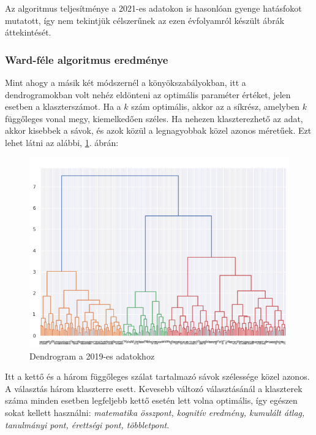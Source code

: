 \documentclass[12pt]{article}
\begin{document}
Az algoritmus teljesítménye a 2021-es adatokon is hasonlóan gyenge hatásfokot mutatott, így nem tekintjük célszerűnek az ezen évfolyamról készült ábrák áttekintését.

\subsubsection{Ward-féle algoritmus eredménye}

Mint ahogy a másik két módszernél a könyökszabályokban, itt a dendrogramokban volt nehéz eldönteni az optimális paraméter értéket, jelen esetben a klaszterszámot. Ha a $k$ szám optimális, akkor az a síkrész, amelyben $k$ függőleges vonal megy, kiemelkedően széles. Ha nehezen klaszterezhető az adat, akkor kisebbek a sávok, és azok közül a legnagyobbak közel azonos méretűek. Ezt lehet látni az alábbi, \ref{fig:dendrogram}. ábrán:

\begin{figure}[H]
\centering
\includegraphics[width = \textwidth]{kepek/dendrogram.png}
\caption{Dendrogram a 2019-es adatokhoz}
\label{fig:dendrogram}
\end{figure}

Itt a kettő és a három függőleges szálat tartalmazó sávok szélessége közel azonos. A választás három klaszterre esett. Kevesebb változó választásánál a klaszterek száma minden esetben legfeljebb kettő esetén lett volna optimális, így egészen sokat kellett használni: \textit{matematika összpont, kognitív eredmény, kumulált átlag, tanulmányi pont, érettségi pont, többletpont}.
\end{document}

